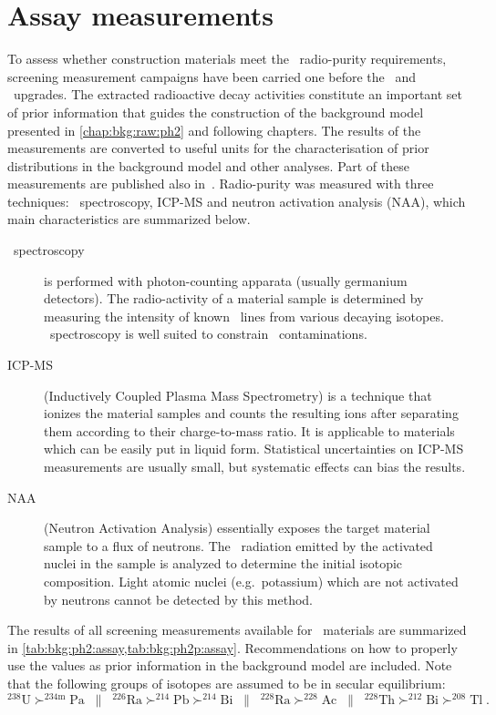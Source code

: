 
\chapter{Assay measurements}%
\label{apdx:assay}

To assess whether construction materials meet the \gerda\ radio-purity requirements,
screening measurement campaigns have been carried one before the \phasetwo\ and \phasetwop\
upgrades. The extracted radioactive decay activities constitute an important set of prior
information that guides the construction of the background model presented in
\cref{chap:bkg:raw:ph2} and following chapters. The results of the measurements are
converted to useful units for the characterisation of prior distributions in the
background model and other analyses. Part of these measurements are published also
in~\cite{Agostini2018a}.
\newpar
Radio-purity was measured with three techniques: \g\ spectroscopy, ICP-MS and neutron
activation analysis (NAA), which main characteristics are summarized below.
\begin{description}
  \item[\g\ spectroscopy] is performed with photon-counting apparata (usually germanium
    detectors). The radio-activity of a material sample is determined by measuring the
    intensity of known \g\ lines from various decaying isotopes. \g\ spectroscopy is
    well suited to constrain \kvn\ contaminations.
  \item[ICP-MS] (Inductively Coupled Plasma Mass Spectrometry) is a technique that ionizes
    the material samples and counts the resulting ions after separating them according to
    their charge-to-mass ratio. It is applicable to materials which can be easily put in
    liquid form. Statistical uncertainties on ICP-MS measurements are usually small, but
    systematic effects can bias the results.
  \item[NAA] (Neutron Activation Analysis) essentially exposes the target material sample
    to a flux of neutrons. The \g\ radiation emitted by the activated nuclei in the sample
    is analyzed to determine the initial isotopic composition. Light atomic nuclei
    (e.g.~potassium) which are not activated by neutrons cannot be detected by this
    method.
\end{description}

The results of all screening measurements available for \gerdatwo\ materials are
summarized in \cref{tab:bkg:ph2:assay,tab:bkg:ph2p:assay}. Recommendations on how to
properly use the values as prior information in the background model are included. Note
that the following groups of isotopes are assumed to be in secular equilibrium:
\[
  ^{238}\text{U}  \succ ^{234\text{m}}\text{Pa}               \;\; \| \;\;
  ^{226}\text{Ra} \succ ^{214}\text{Pb} \succ ^{214}\text{Bi} \;\; \| \;\;
  ^{228}\text{Ra} \succ ^{228}\text{Ac}                       \;\; \| \;\;
  ^{228}\text{Th} \succ ^{212}\text{Bi} \succ ^{208}\text{Tl} \;.
\]

